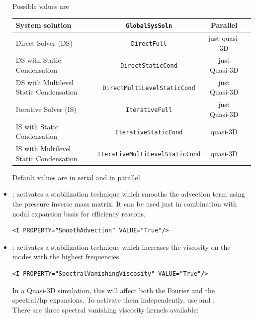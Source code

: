 \begin{itemize}
Possible values are
\begin{center}
\footnotesize
\begin{tabular}{lccc}
\toprule
{System solution} & \texttt{GlobalSysSoln} &{Parallel}\\
\midrule
Direct Solver (DS) & \texttt{DirectFull} & just quasi-3D \\
DS with Static Condensation  & \texttt{DirectStaticCond} & just Quasi-3D \\
DS with Multilevel Static Condensation & \texttt{DirectMultiLevelStaticCond} & just Quasi-3D \\
 Iterative Solver (IS) & \texttt{IterativeFull} & just Quasi-3D \\
IS with Static Condensation  & \texttt{IterativeStaticCond} & quasi-3D \\
IS with Multilevel Static Condensation & \texttt{IterativeMultiLevelStaticCond} & quasi-3D \\
\bottomrule
\end{tabular}
\end{center}

Default values are  in serial and
 in parallel.

\item {}: activates a stabilization technique which smooths
the advection term using the pressure inverse mass matrix. It can be used just in combination with nodal expansion basis for efficiency reasons.

\begin{lstlisting}[style=XMLStyle]
<I PROPERTY="SmoothAdvection" VALUE="True"/>
\end{lstlisting}

\item {}: activates a stabilization technique
which increases the viscosity on the modes with the highest frequencies.
\begin{lstlisting}[style=XMLStyle]
<I PROPERTY="SpectralVanishingViscosity" VALUE="True"/>
\end{lstlisting}

In a Quasi-3D simulation, this will affect both the Fourier and the spectral/hp expansions.
To activate them independently, use  
and . \\

There are three spectral vanishing viscosity kernels available:


\end{itemize}
